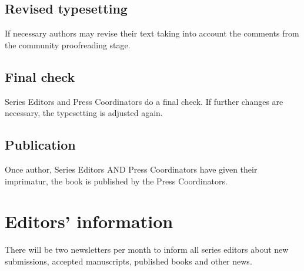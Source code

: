 
\subsection{Revised typesetting}

If necessary authors may revise their text taking into account the comments from the community proofreading stage.

\subsection{Final check}

Series Editors and Press Coordinators do a final check. If further changes are necessary, the
typesetting is adjusted again.


\subsection{Publication}

Once author, Series Editors AND Press Coordinators have given their imprimatur, the book is published by the Press Coordinators.


\section{Editors' information}
\label{sec-editors-information}

There will be two newsletters per month to inform all series editors about new submissions, accepted
manuscripts, published books and other news. 
